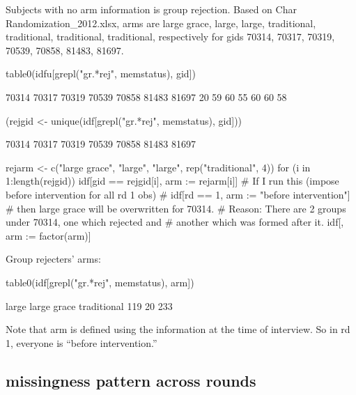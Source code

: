 Subjects with no \textsf{arm} information is group rejection. Based on \textsf{Char Randomization\_2012.xlsx}, arms are large grace, large, large, traditional, traditional, traditional, traditional, respectively for \textsf{gid}s 70314, 70317, 70319, 70539, 70858, 81483, 81697. 
\begin{Schunk}
\begin{Sinput}
table0(idfu[grepl("gr.*rej", memstatus), gid])
\end{Sinput}
\begin{Soutput}

70314 70317 70319 70539 70858 81483 81697 
   20    59    60    55    60    60    58 
\end{Soutput}
\begin{Sinput}
(rejgid <- unique(idf[grepl("gr.*rej", memstatus), gid]))
\end{Sinput}
\begin{Soutput}
[1] 70314 70317 70319 70539 70858 81483 81697
\end{Soutput}
\begin{Sinput}
rejarm <- c("large grace", "large", "large", rep("traditional", 4))
for (i in 1:length(rejgid)) idf[gid == rejgid[i], arm := rejarm[i]]
# If I run this (impose before intervention for all rd 1 obs)
# idf[rd == 1, arm := "before intervention"]
# then large grace will be overwritten for 70314.
# Reason: There are 2 groups under 70314, one which rejected and
# another which was formed after it. 
idf[, arm := factor(arm)]
\end{Sinput}
\end{Schunk}
Group rejecters' arms:
\begin{Schunk}
\begin{Sinput}
table0(idf[grepl("gr.*rej", memstatus), arm])
\end{Sinput}
\begin{Soutput}

      large large grace traditional 
        119          20         233 
\end{Soutput}
\end{Schunk}
Note that \textsf{arm} is defined using the information at the time of interview. So in rd 1, everyone is ``before intervention.'' 

\subsection{missingness pattern across rounds}

